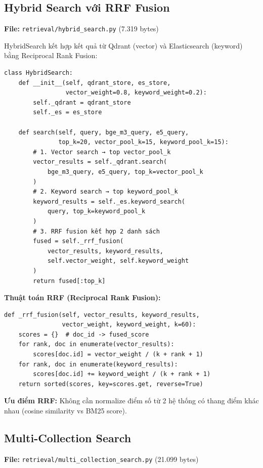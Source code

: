 \documentclass[../DoAn.tex]{subfiles}
\begin{document}
\subsection{Hybrid Search với RRF Fusion}
\textbf{File:} \texttt{retrieval/hybrid\_search.py} (7.319 bytes)

HybridSearch kết hợp kết quả từ Qdrant (vector) và Elasticsearch (keyword) bằng Reciprocal Rank Fusion:
\begin{verbatim}
class HybridSearch:
    def __init__(self, qdrant_store, es_store,
                 vector_weight=0.8, keyword_weight=0.2):
        self._qdrant = qdrant_store
        self._es = es_store

    def search(self, query, bge_m3_query, e5_query,
               top_k=20, vector_pool_k=15, keyword_pool_k=15):
        # 1. Vector search → top vector_pool_k
        vector_results = self._qdrant.search(
            bge_m3_query, e5_query, top_k=vector_pool_k
        )
        # 2. Keyword search → top keyword_pool_k
        keyword_results = self._es.keyword_search(
            query, top_k=keyword_pool_k
        )
        # 3. RRF fusion kết hợp 2 danh sách
        fused = self._rrf_fusion(
            vector_results, keyword_results,
            self.vector_weight, self.keyword_weight
        )
        return fused[:top_k]
\end{verbatim}

\textbf{Thuật toán RRF (Reciprocal Rank Fusion):}
\begin{verbatim}
def _rrf_fusion(self, vector_results, keyword_results,
                vector_weight, keyword_weight, k=60):
    scores = {}  # doc_id -> fused_score
    for rank, doc in enumerate(vector_results):
        scores[doc.id] = vector_weight / (k + rank + 1)
    for rank, doc in enumerate(keyword_results):
        scores[doc.id] += keyword_weight / (k + rank + 1)
    return sorted(scores, key=scores.get, reverse=True)
\end{verbatim}

\textbf{Ưu điểm RRF:} Không cần normalize điểm số từ 2 hệ thống có thang điểm khác nhau (cosine similarity vs BM25 score).

\subsection{Multi-Collection Search}
\textbf{File:} \texttt{retrieval/multi\_collection\_search.py} (21.099 bytes)
\end{document}
